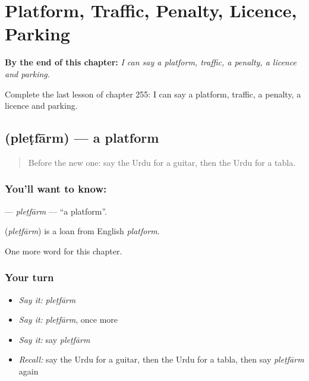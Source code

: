
\chapter{Platform, Traffic, Penalty, Licence, Parking}
\label{ch:ur-platform-traffic-penalty-licence-parking}

\begin{chapteropening}
\textbf{By the end of this chapter:} \emph{I can say a platform, traffic, a penalty, a licence and parking.}

Complete the last lesson of chapter 255: I can say a platform, traffic, a penalty, a licence and parking.
\end{chapteropening}

\section[\texorpdfstring{\ur{پلیٹ} \ur{فارم} (pleṭfārm)}{پلیٹ فارم (pleṭfārm)}]{  (pleṭfārm) — a platform}

\label{lesson:UR-C255-pletfarm}



\begin{quote}
Before the new one: say the Urdu for a guitar, then the Urdu for a tabla.
\end{quote}

\subsection*{You'll want to know:  }
\textbf{ } — \emph{pleṭfārm} — \textquotedblleft{}a platform\textquotedblright{}.

\begin{cousinweb}
\textbf{ } (\emph{pleṭfārm}) is a loan from English \emph{platform}.
\end{cousinweb}

\begin{grammarlens}[title={What you've built}]
One more word for this chapter.
\end{grammarlens}

\subsection*{Your turn}
\begin{itemize}
\raggedright
  \item \emph{Say it:} \emph{pleṭfārm}
  \item \emph{Say it:} \emph{pleṭfārm}, once more
  \item \emph{Say it:} say \emph{pleṭfārm}
  \item \emph{Recall:} say the Urdu for a guitar, then the Urdu for a tabla, then say \emph{pleṭfārm} again
\end{itemize}


